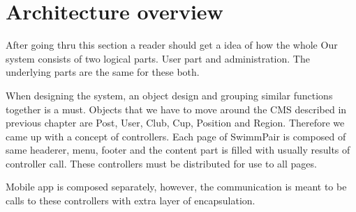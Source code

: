 \chapter{Architecture overview}
After going thru this section a reader should get a idea of how the whole Our system consists of two logical parts. User part and administration. The underlying parts are the same for these both.
\par
When designing the system, an object design and grouping similar functions together is a must. Objects that we have to move around the CMS described in previous chapter are Post, User, Club, Cup, Position and Region. Therefore we came up with a concept of controllers. Each page of SwimmPair is composed of same headerer, menu, footer and the content part is filled with usually results of controller call. These controllers must be distributed for use to all pages.
\par
Mobile app is composed separately, however, the communication is meant to be  calls to these controllers with extra layer of encapsulation.
